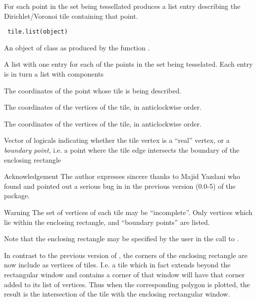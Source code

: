\begin{Description}\relax
For each point in the set being tessellated produces a list
entry describing the Dirichlet/Voronoi tile containing that
point.
\end{Description}
\begin{Usage}
\begin{verbatim} tile.list(object) \end{verbatim}
\end{Usage}
\begin{Arguments}
\begin{ldescription}
\item[\code{object}] An object of class  as produced
by the function .
\end{ldescription}
\end{Arguments}
\begin{Value}
A list with one entry for each of the points in the set
being tesselated.  Each entry is in turn a list with
components

\begin{ldescription}
\item[\code{pt}] The coordinates of the point whose tile is being described.
\item[\code{x}] The  coordinates of the vertices of the tile, in
anticlockwise order.
\item[\code{y}] The  coordinates of the vertices of the tile, in
anticlockwise order.
\item[\code{bp}] Vector of logicals indicating whether the tile vertex is a
``real'' vertex, or a \emph{boundary point}, i.e. a point where the
tile edge intersects the boundary of the enclosing rectangle
\end{ldescription}
\end{Value}
\begin{Section}{Acknowledgement}
The author expresses sincere thanks to Majid Yazdani who found and
pointed out a serious bug in  in the previous
version (0.0-5) of the  package.
\end{Section}
\begin{Section}{Warning}
The set of vertices of each tile may be ``incomplete''.  Only
vertices which lie within the enclosing rectangle, and ``boundary
points'' are listed.

Note that the enclosing rectangle may be specified by the user
in the call to .

In contrast to the previous version of , the
corners of the enclosing rectangle are now include as vertices
of tiles.  I.e. a tile which in fact extends beyond the rectangular
window and contains a corner of that window will have that
corner added to its list of vertices.  Thus when the corresponding
polygon is plotted, the result is the intersection of the tile
with the enclosing rectangular window.
\end{Section}

